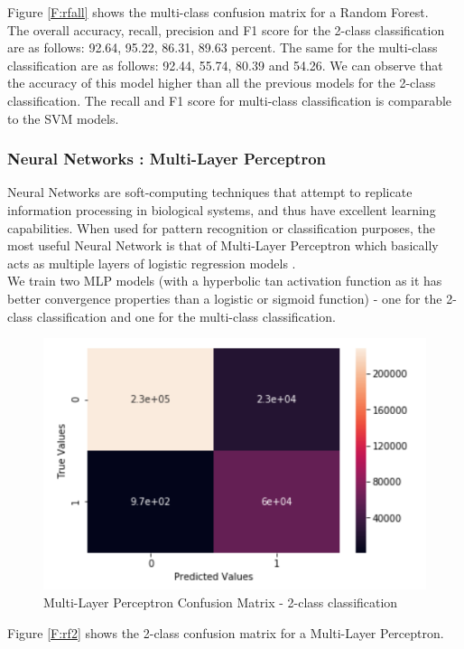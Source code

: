 Figure \ref{F:rfall} shows the multi-class confusion matrix for a Random Forest.\\
The overall accuracy, recall, precision and F1 score for the 2-class classification are as follows: 92.64, 95.22, 86.31, 89.63 percent. The same for the multi-class classification are as follows: 92.44, 55.74, 80.39
and 54.26. We can observe that the accuracy of this model higher than all the previous models for the 2-class classification. The recall and F1 score for multi-class classification is comparable to the SVM models.

\subsubsection{Neural Networks : Multi-Layer Perceptron}
Neural Networks are soft-computing techniques that attempt to replicate information processing in biological systems, and thus have excellent learning capabilities. When used for pattern recognition or classification purposes, the most useful Neural Network is that of Multi-Layer Perceptron which basically acts as multiple layers of logistic regression models \cite{bishop10}.\\
We train two MLP models (with a hyperbolic tan activation function as it has better convergence properties than a logistic or sigmoid function) - one for the 2-class classification and one for the multi-class classification. 
\begin{figure}
	\includegraphics[width=1.0\columnwidth]{images/nn2.PNG}
	\caption{Multi-Layer Perceptron Confusion Matrix - 2-class classification}
	\label{F:nn2}
\end{figure}
Figure \ref{F:rf2} shows the 2-class confusion matrix for a Multi-Layer Perceptron.
